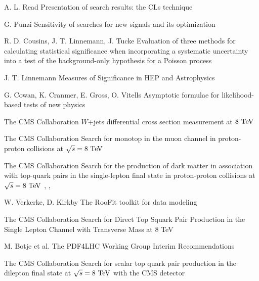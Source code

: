
{A. L. Read}
{Presentation of search results: the CLs technique}
{}

{G. Punzi}
{Sensitivity of searches for new signals and its optimization}
{}

{R. D. Cousins, J. T. Linnemann, J. Tucke}
{Evaluation of three methods for calculating
statistical significance when incorporating a
systematic uncertainty into a test of the
background-only hypothesis for a Poisson
process}
{}

{J. T. Linnemann}
{Measures of Significance in HEP and Astrophysics}
{}

{G. Cowan, K. Cranmer, E. Gross, O. Vitells}
{Asymptotic formulae for likelihood-based tests of new physics}
{}


{The CMS Collaboration}
{$W$+jets differential cross section measurement at $8~\text{TeV}$}
{}

{The CMS Collaboration}
{Search for monotop in the muon channel in proton-proton collisions at $\sqrt{s} = 8~\text{TeV}$}
{}

{The CMS Collaboration}
{Search for the production of dark matter in association with top-quark pairs
in the single-lepton final state in proton-proton collisions at $\sqrt{s} = 8~\text{TeV}$}
{, , }

{W. Verkerke, D. Kirkby}
{The RooFit toolkit for data modeling}
{}


{The CMS Collaboration}
{Search for Direct Top Squark Pair Production in the Single Lepton Channel
with Transverse Mass at 8 TeV}
{}

{M. Botje et al.}
{The PDF4LHC Working Group Interim Recommendations}
{}


{The CMS Collaboration}
{Search for scalar top quark pair production in the dilepton
final state at $\sqrt{s} = 8~\text{TeV}$ with the CMS detector}
{}

